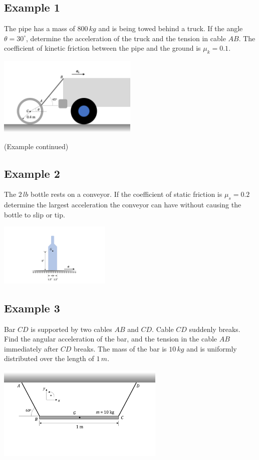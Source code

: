 \documentclass[12pt,letterpaper,twoside]{report}
\begin{document}
\subsection{Example 1}
The pipe has a mass of $800 \, kg$ and is being towed behind a truck.  If the angle $\theta =30^{\circ}$, determine the acceleration of the truck and the tension in cable $AB$.  The coefficient of kinetic friction between the pipe and the ground is $\mu_k = 0.1$.

\includegraphics[trim={2cm 1cm 5cm 2cm},clip,width=0.5\textwidth, left]{Slide51} 

\newpage

(Example continued)
\newpage

\subsection{Example 2}
The $2 \, lb$ bottle rests on a conveyor.  If the coefficient of static friction is $\mu_s = 0.2$ determine the largest acceleration the conveyor can have without causing the bottle to slip or tip.  

\includegraphics[trim={8cm 1cm 5cm 2cm},clip,width=0.4\textwidth, left]{Slide52} 

\newpage

\subsection{Example 3}
Bar $CD$ is supported by two cables $AB$ and $CD$.  Cable $CD$ suddenly breaks.  Find the angular acceleration of the bar, and the tension in the cable $AB$ immediately after $CD$ breaks.  The mass of the bar is $10 \, kg$ and is uniformly distributed over the length of $1 \, m$.

\includegraphics[trim={1cm 4cm 1cm 1cm},clip,width=0.6\textwidth, left]{Slide53} 
\end{document}
